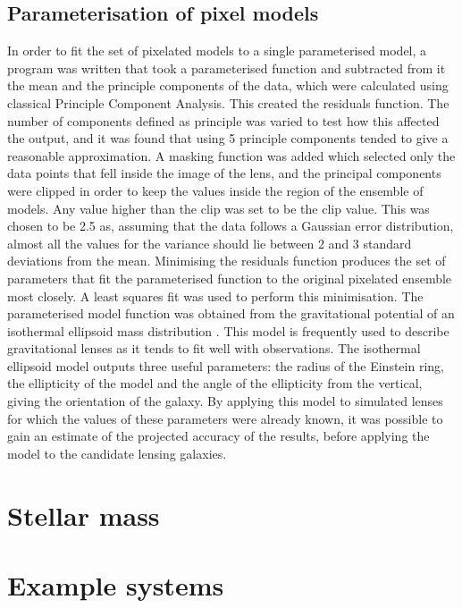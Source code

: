 \documentclass[fleqn,usenatbib]{mnras}
\begin{document}
\subsection{Parameterisation of pixel models} \label{sec:parameter}
In order to fit the set of pixelated models to a single parameterised model, a program was written that took a parameterised function and subtracted from it the mean and the principle components of the data, which were calculated using classical Principle Component Analysis.
This created the residuals function.
The number of components defined as principle was varied to test how this affected the output, and it was found that using 5 principle components tended to give a reasonable approximation.
A masking function was added which selected only the data points that fell inside the image of the lens, and the principal components were clipped in order to keep the values inside the region of the ensemble of models.
Any value higher than the clip was set to be the clip value.
This was chosen to be 2.5 as, assuming that the data follows a Gaussian error distribution, almost all the values for the variance should lie between 2 and 3 standard deviations from the mean.
Minimising the residuals function produces the set of parameters that fit the parameterised function to the original pixelated ensemble most closely.
A least squares fit was used to perform this minimisation.
The parameterised model function was obtained from the gravitational potential of an isothermal ellipsoid mass distribution \cite{2001astro.ph..2341K}.
This model is frequently used to describe gravitational lenses as it tends to fit well with observations.
The isothermal ellipsoid model outputs three useful parameters: the radius of the Einstein ring, the ellipticity of the model and the angle of the ellipticity from the vertical, giving the orientation of the galaxy.
By applying this model to simulated lenses for which the values of these parameters were already known, it was possible to gain an estimate of the projected accuracy of the results, before applying the model to the candidate lensing galaxies.

\section{Stellar mass}


\section{Example systems}\label{sec:examples}
\end{document}
